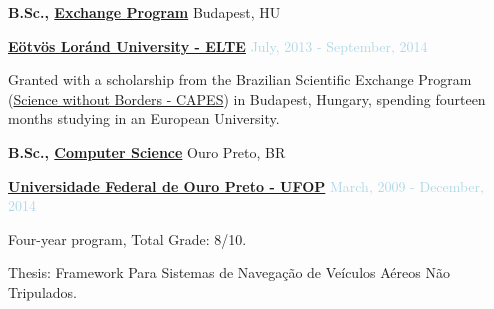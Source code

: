 \textbf{B.Sc., 
        \href{https://www.elte.hu}
             {Exchange Program}} \hfill Budapest, HU

\begin{outerlist}

\item[] \href{https://www.elte.hu}{\textbf{Eötvös Loránd University - ELTE}} \hfill {\textcolor{lightblue}{July, 2013 - September, 2014}} \medskip
        \begin{innerlist}[-]
        \item Granted with a scholarship from the Brazilian Scientific Exchange Program (\href{http://capes.gov.br/images/stories/download/diversos/folder-SWB.pdf}{Science without Borders - CAPES}) in Budapest, Hungary, spending fourteen months studying in an European University.
        \end{innerlist}

\end{outerlist}

\textbf{B.Sc., 
        \href{https://ufop.br}
             {Computer Science}} \hfill Ouro Preto, BR

\begin{outerlist}

\item[] \href{https://ufop.br}{\textbf{Universidade Federal de Ouro Preto - UFOP}} \hfill {\textcolor{lightblue}{March, 2009 - December, 2014}} \medskip
        \begin{innerlist}[-]
        \item Four-year program, Total Grade: 8/10.
        \item Thesis: Framework Para Sistemas de Navegação de Veículos Aéreos Não Tripulados.
        \end{innerlist}

\end{outerlist}

